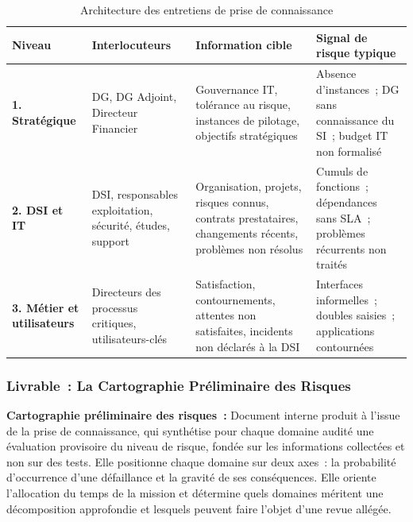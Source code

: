 \begin{table}[H]
\centering
\small
\renewcommand{\arraystretch}{1.4}
\caption{Architecture des entretiens de prise de connaissance}
\label{tab:entretiens-pdcon}
\begin{tabular}{|p{2.2cm}|p{2.8cm}|p{4cm}|p{3.2cm}|}
    \hline
    \rowcolor{gray!20}
    \textbf{Niveau} & \textbf{Interlocuteurs} &
    \textbf{Information cible} & \textbf{Signal de risque typique} \\ \hline
    \textbf{1. Stratégique} &
    DG, DG Adjoint, Directeur Financier &
    Gouvernance IT, tolérance au risque, instances de pilotage,
    objectifs stratégiques &
    Absence d'instances~; DG sans connaissance du SI~;
    budget IT non formalisé \\ \hline
    \textbf{2. DSI et IT} &
    DSI, responsables exploitation, sécurité, études, support &
    Organisation, projets, risques connus, contrats prestataires,
    changements récents, problèmes non résolus &
    Cumuls de fonctions~; dépendances sans SLA~;
    problèmes récurrents non traités \\ \hline
    \textbf{3. Métier et utilisateurs} &
    Directeurs des processus critiques, utilisateurs-clés &
    Satisfaction, contournements, attentes non satisfaites,
    incidents non déclarés à la DSI &
    Interfaces informelles~; doubles saisies~;
    applications contournées \\ \hline
\end{tabular}
\end{table}

\subsubsection{Livrable~: La Cartographie Préliminaire des Risques}
\label{subsubsec:livrable-pdcon}

\begin{boxdef}
\textbf{Cartographie préliminaire des risques~:}
Document interne produit à l'issue de la prise de connaissance, qui synthétise pour
chaque domaine audité une évaluation provisoire du niveau de risque, fondée sur les
informations collectées et non sur des tests. Elle positionne chaque domaine sur deux
axes~: la probabilité d'occurrence d'une défaillance et la gravité de ses conséquences.
Elle oriente l'allocation du temps de la mission et détermine quels domaines méritent
une décomposition approfondie et lesquels peuvent faire l'objet d'une revue allégée.
\end{boxdef}

